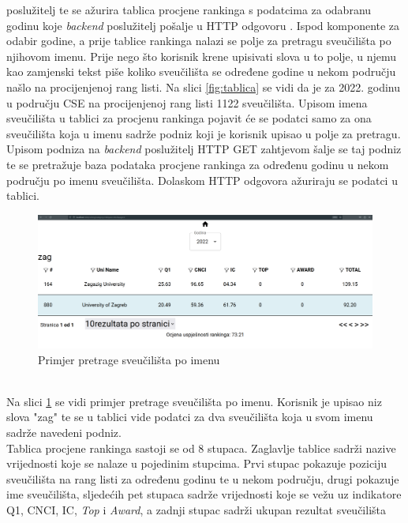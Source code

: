 \documentclass[times, utf8, zavrsni]{fer}
\begin{document}
poslužitelj te se ažurira tablica procjene rankinga s podatcima za odabranu godinu koje \emph{backend} poslužitelj pošalje u HTTP odgovoru .
\newpage Ispod komponente za odabir godine, a prije tablice rankinga
nalazi se polje za pretragu sveučilišta po njihovom imenu. Prije nego što korisnik krene upisivati slova u to polje, u njemu kao zamjenski tekst 
piše koliko sveučilišta se određene godine u nekom području našlo na procijenjenoj rang listi. Na slici \ref{fig:tablica} se vidi da je za 2022. godinu u području CSE 
na procijenjenoj rang listi 1122 sveučilišta.
Upisom imena sveučilišta u tablici za procjenu rankinga pojavit će se podatci samo za ona sveučilišta
koja u imenu sadrže podniz koji je korisnik upisao u polje za pretragu. Upisom podniza na \emph{backend} poslužitelj HTTP GET zahtjevom šalje se taj podniz te se 
pretražuje baza podataka procjene rankinga za određenu godinu u nekom području po imenu sveučilišta. Dolaskom HTTP odgovora ažuriraju se podatci u tablici.\\
\begin{figure}[htb]
    \hspace*{-2cm}  
       \includegraphics[scale=0.21]{search.png} 
       \caption{Primjer pretrage sveučilišta po imenu}
       \label{fig:search}
       \end{figure}
\\Na slici \ref{fig:search} se vidi primjer pretrage sveučilišta po imenu. Korisnik je upisao niz slova "zag" te se u tablici vide podatci za dva sveučilišta
koja u svom imenu sadrže navedeni podniz. 
\\Tablica procjene rankinga sastoji se od 8 stupaca. Zaglavlje tablice sadrži nazive vrijednosti koje se nalaze u pojedinim stupcima.
Prvi stupac pokazuje poziciju sveučilišta na rang listi za određenu godinu te u nekom području, drugi 
pokazuje ime sveučilišta, sljedećih pet stupaca sadrže vrijednosti koje se vežu uz indikatore Q1, CNCI, IC, \emph{Top} i \emph{Award}, a zadnji stupac sadrži ukupan rezultat sveučilišta 
\end{document}
